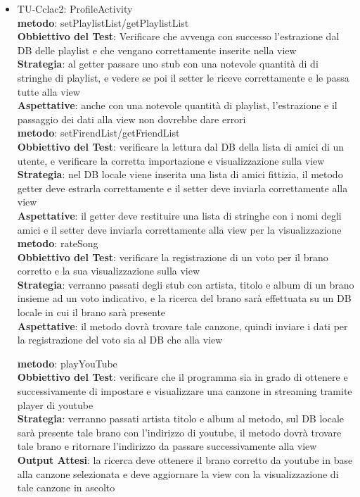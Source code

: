 \begin{itemize}

\item TU-Cclac2:  ProfileActivity\\
\textbf{metodo}: setPlaylistList/getPlaylistList\\
\textbf{Obbiettivo del Test}: Verificare che avvenga con successo l'estrazione dal DB
delle playlist e che vengano correttamente inserite nella view\\
\textbf{Strategia}: al getter passare uno stub con una notevole quantit\`a di di stringhe di playlist,
 e vedere se poi il setter le riceve correttamente e le passa tutte alla view\\
\textbf{Aspettative}: anche con una notevole quantit\`a di playlist,
l'estrazione e il passaggio dei dati alla view non dovrebbe dare errori\\

\textbf{metodo}: setFirendList/getFriendList\\
\textbf{Obbiettivo del Test}: verificare la lettura dal DB della lista di amici di un
utente, e verificare la corretta importazione e visualizzazione sulla view\\
\textbf{Strategia}: nel DB locale viene inserita una lista di amici
fittizia, il metodo getter deve estrarla correttamente e il setter deve inviarla
correttamente alla view\\
\textbf{Aspettative}: il getter deve restituire una lista di stringhe con i nomi degli amici e il setter deve inviarla correttamente alla view per la visualizzazione\\


\textbf{metodo}: rateSong\\
\textbf{Obbiettivo del Test}: verificare la registrazione di un voto per il
brano corretto e la sua visualizzazione sulla view\\
\textbf{Strategia}: verranno passati degli stub con artista, titolo e album di
un brano insieme ad un voto indicativo, e la ricerca del brano sar\`a
effettuata su un DB locale in cui il brano sar\`a presente\\
\textbf{Aspettative}: il metodo dovr\`a trovare tale canzone, quindi inviare i
dati per la registrazione del voto sia al DB che alla view

\textbf{metodo}: playYouTube\\
\textbf{Obbiettivo del Test}: verificare che il
programma sia in grado di ottenere e successivamente di impostare e visualizzare una canzone in streaming tramite
player di youtube\\
\textbf{Strategia}: verranno passati artista titolo e album al metodo, sul DB
locale sar\`a presente tale brano con l'indirizzo di youtube, il metodo
dovr\`a trovare tale brano e ritornare l'indirizzo da passare successivamente
alla view\\
\textbf{Output Attesi}: la ricerca deve ottenere il brano corretto
da youtube in base alla canzone selezionata e deve aggiornare la view con la visualizzazione di tale canzone in ascolto \\


\end{itemize}
